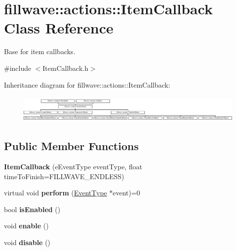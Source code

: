 \hypertarget{classfillwave_1_1actions_1_1ItemCallback}{}\section{fillwave\+:\+:actions\+:\+:Item\+Callback Class Reference}
\label{classfillwave_1_1actions_1_1ItemCallback}


Base for item callbacks.  




{\ttfamily \#include $<$Item\+Callback.\+h$>$}

Inheritance diagram for fillwave\+:\+:actions\+:\+:Item\+Callback\+:\begin{figure}[H]
\begin{center}
\leavevmode
\includegraphics[height=1.377614cm]{classfillwave_1_1actions_1_1ItemCallback}
\end{center}
\end{figure}
\subsection*{Public Member Functions}
\begin{DoxyCompactItemize}
\item 
\hypertarget{classfillwave_1_1actions_1_1ItemCallback_a6973e37a4848cc91a723c637765edb49}{}{\bfseries Item\+Callback} (e\+Event\+Type event\+Type, float time\+To\+Finish=F\+I\+L\+L\+W\+A\+V\+E\+\_\+\+E\+N\+D\+L\+E\+S\+S)\label{classfillwave_1_1actions_1_1ItemCallback_a6973e37a4848cc91a723c637765edb49}

\item 
\hypertarget{classfillwave_1_1actions_1_1ItemCallback_aecdcaa43453d5dd262f1c15fe3eb993a}{}virtual void {\bfseries perform} (\hyperlink{classfillwave_1_1actions_1_1EventType}{Event\+Type} $\ast$event)=0\label{classfillwave_1_1actions_1_1ItemCallback_aecdcaa43453d5dd262f1c15fe3eb993a}

\item 
\hypertarget{classfillwave_1_1actions_1_1ItemCallback_acc05ed722cfc8382a366d3bfc6d4c826}{}bool {\bfseries is\+Enabled} ()\label{classfillwave_1_1actions_1_1ItemCallback_acc05ed722cfc8382a366d3bfc6d4c826}

\item 
\hypertarget{classfillwave_1_1actions_1_1ItemCallback_a4c9b7e5cfd4140bd839d4cf32acad4d8}{}void {\bfseries enable} ()\label{classfillwave_1_1actions_1_1ItemCallback_a4c9b7e5cfd4140bd839d4cf32acad4d8}

\item 
\hypertarget{classfillwave_1_1actions_1_1ItemCallback_abd8d654db1ccca4d04bd74c6244608c7}{}void {\bfseries disable} ()\label{classfillwave_1_1actions_1_1ItemCallback_abd8d654db1ccca4d04bd74c6244608c7}

\end{DoxyCompactItemize}
